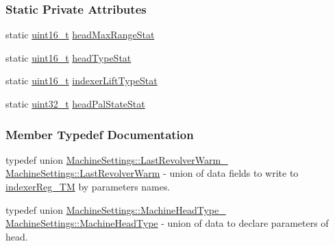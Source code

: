 \subsubsection*{Static Private Attributes}
\begin{DoxyCompactItemize}
\item 
static \mbox{\hyperlink{settings_8h_a017dd44e68049ffdd31500a8cd01ba68}{uint16\+\_\+t}} \mbox{\hyperlink{classMachineSettings_ab223e2bea0de3ab0c85452d124d2b434}{head\+Max\+Range\+Stat}}
\item 
static \mbox{\hyperlink{settings_8h_a017dd44e68049ffdd31500a8cd01ba68}{uint16\+\_\+t}} \mbox{\hyperlink{classMachineSettings_a1cfa5a234b9cbce7c1e1b881992e1d2e}{head\+Type\+Stat}}
\item 
static \mbox{\hyperlink{settings_8h_a017dd44e68049ffdd31500a8cd01ba68}{uint16\+\_\+t}} \mbox{\hyperlink{classMachineSettings_a358c9d4ed568f50c5279c7019c97ffc2}{indexer\+Lift\+Type\+Stat}}
\item 
static \mbox{\hyperlink{settings_8h_a4196118492a3b1493c81f250e90af775}{uint32\+\_\+t}} \mbox{\hyperlink{classMachineSettings_a1543a985ca7e47a2853dcfef75227a5a}{head\+Pal\+State\+Stat}}
\end{DoxyCompactItemize}


\subsubsection{Member Typedef Documentation}
\mbox{\label{classMachineSettings_ad31cf583a3d6462e47d920209239ffe6}} 
{\footnotesize\ttfamily typedef union \mbox{\hyperlink{unionMachineSettings_1_1LastRevolverWarm__}{Machine\+Settings\+::\+Last\+Revolver\+Warm\+\_\+}} \mbox{\hyperlink{classMachineSettings_ad31cf583a3d6462e47d920209239ffe6}{Machine\+Settings\+::\texorpdfstring{Last\+Revolver\+Warm}{LastRevolverWarm}}}} - union of data fields to write to \hyperlink{structRegister_1_1IndexerReg___1_1reg_a9b0063135d16e0ea6f47284c361bfb03}{indexer\+Reg\+\_\+\+TM} by parameters names.

\mbox{\label{classMachineSettings_ab7b6a5e7f8a67169e7c28067e7d4bbe9}} 
{\footnotesize\ttfamily typedef union \mbox{\hyperlink{unionMachineSettings_1_1MachineHeadType__}{Machine\+Settings\+::\+Machine\+Head\+Type\+\_\+}} \mbox{\hyperlink{classMachineSettings_ab7b6a5e7f8a67169e7c28067e7d4bbe9}{Machine\+Settings\+::\texorpdfstring{Machine\+Head\+Type}{MachineHeadType}}}} - union of data to declare parameters of head.

